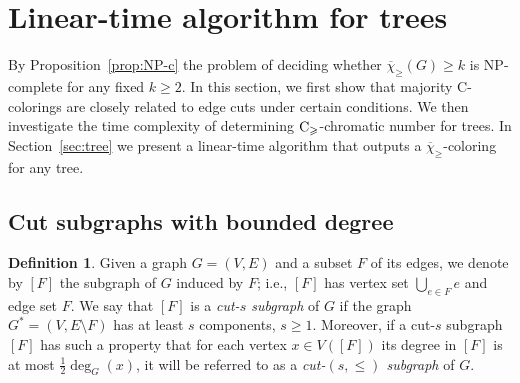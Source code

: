 \documentclass{article}
\theoremstyle{definition}
\newtheorem{definition}{Definition}
\newcommand{\mc}{\overline{\chi}_{\geqslant}}
\newcommand{\cg}{{\rm C}_{\geqslant}}
\begin{document}
    
\section{Linear-time algorithm for trees}
\label{sec:sec-tree}
By Proposition~\ref{prop:NP-c} the problem of deciding whether $\mc(G)\geq k$ is NP-complete for any fixed $k\geq 2$. 
In this section, we first show that majority 
C-colorings are closely related to edge cuts under certain conditions. We then investigate the time complexity of determining $\cg$-chromatic number for trees. In Section~\ref{sec:tree} we present a linear-time algorithm that outputs a $\mc$-coloring for any tree.

\subsection{Cut subgraphs with bounded degree}

\begin{definition}
     Given a graph $G = (V,E)$ and a subset $F$ of its edges, we denote by $[F]$ the subgraph of $G$ induced by $F$; i.e., $[F]$ has vertex set $\bigcup_{e\in F} e$ and edge set $F$. 
     We say that $[F]$ is a \emph{cut-$s$ subgraph} of $G$ if the graph $G^* = (V,E \setminus F)$ has at least $s$ components, $s \ge 1$.  
     Moreover, if a cut-$s$ subgraph $[F]$ has such a property that for each vertex $x \in V([F])$ its degree in $[F]$ is at most $ \frac{1}{2}\deg_G(x)$, it will be referred to as a \emph{cut-$(s,\leqslant)$ subgraph} of $G$.
\end{definition}
\end{document}
